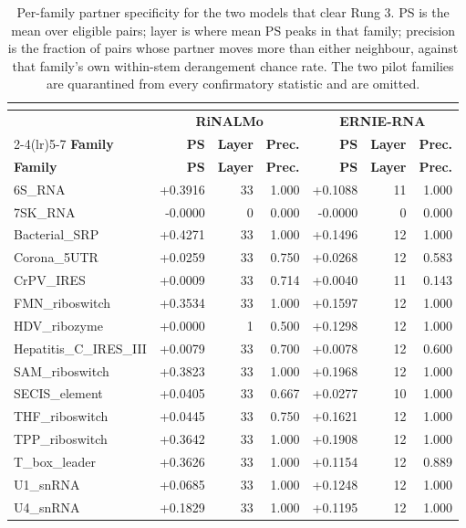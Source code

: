 \documentclass[11pt]{article}
\begin{document}
\begin{longtable}{@{}lrrrrrr@{}}
\caption{Per-family partner specificity for the two models that clear Rung 3. PS is the mean over eligible pairs; layer is where mean PS peaks in that family; precision is the fraction of pairs whose partner moves more than either neighbour, against that family's own within-stem derangement chance rate. The two pilot families are quarantined from every confirmatory statistic and are omitted.}\\
\label{tab:s3}\\
\toprule
 & \multicolumn{3}{c}{\textbf{RiNALMo}} & \multicolumn{3}{c}{\textbf{ERNIE-RNA}} \\
\cmidrule(lr){2-4}\cmidrule(lr){5-7}
\textbf{Family} & \textbf{PS} & \textbf{Layer} & \textbf{Prec.} & \textbf{PS} & \textbf{Layer} & \textbf{Prec.} \\
\midrule
\endfirsthead
\toprule
\textbf{Family} & \textbf{PS} & \textbf{Layer} & \textbf{Prec.} & \textbf{PS} & \textbf{Layer} & \textbf{Prec.} \\
\midrule
\endhead
6S\_RNA & +0.3916 & 33 & 1.000 & +0.1088 & 11 & 1.000 \\
7SK\_RNA & -0.0000 & 0 & 0.000 & -0.0000 & 0 & 0.000 \\
Bacterial\_SRP & +0.4271 & 33 & 1.000 & +0.1496 & 12 & 1.000 \\
Corona\_5UTR & +0.0259 & 33 & 0.750 & +0.0268 & 12 & 0.583 \\
CrPV\_IRES & +0.0009 & 33 & 0.714 & +0.0040 & 11 & 0.143 \\
FMN\_riboswitch & +0.3534 & 33 & 1.000 & +0.1597 & 12 & 1.000 \\
HDV\_ribozyme & +0.0000 & 1 & 0.500 & +0.1298 & 12 & 1.000 \\
Hepatitis\_C\_IRES\_III & +0.0079 & 33 & 0.700 & +0.0078 & 12 & 0.600 \\
SAM\_riboswitch & +0.3823 & 33 & 1.000 & +0.1968 & 12 & 1.000 \\
SECIS\_element & +0.0405 & 33 & 0.667 & +0.0277 & 10 & 1.000 \\
THF\_riboswitch & +0.0445 & 33 & 0.750 & +0.1621 & 12 & 1.000 \\
TPP\_riboswitch & +0.3642 & 33 & 1.000 & +0.1908 & 12 & 1.000 \\
T\_box\_leader & +0.3626 & 33 & 1.000 & +0.1154 & 12 & 0.889 \\
U1\_snRNA & +0.0685 & 33 & 1.000 & +0.1248 & 12 & 1.000 \\
U4\_snRNA & +0.1829 & 33 & 1.000 & +0.1195 & 12 & 1.000 \\

\end{longtable}
\end{document}
